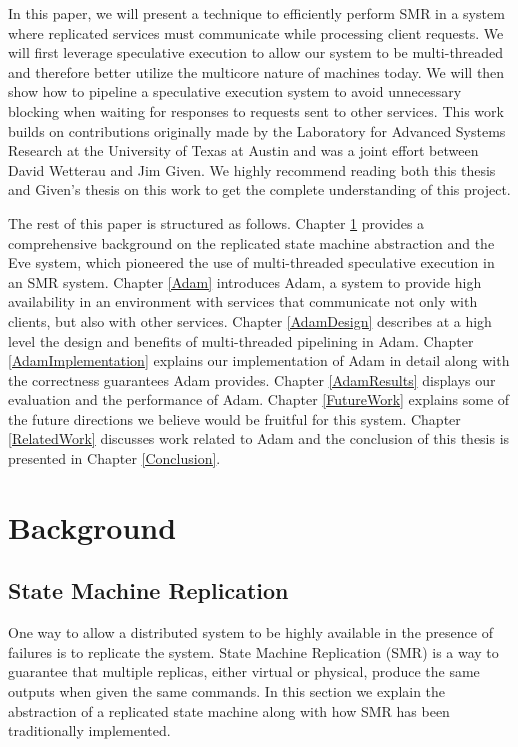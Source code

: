 \documentclass[11pt, oneside]{report}
\begin{document}
In this paper, we will present a technique to efficiently perform SMR in a system where replicated services must communicate while processing client requests.
We will first leverage speculative execution \cite{eve, zyz} to allow our system to be multi-threaded and therefore better utilize the multicore nature of machines today. 
We will then show how to pipeline a speculative execution system to avoid unnecessary blocking when waiting for responses to requests sent to other services.
This work builds on contributions originally made by the Laboratory for Advanced Systems Research at the University of Texas at Austin \cite{eve, manosThesis} and was a joint effort between David Wetterau and Jim Given. 
We highly recommend reading both this thesis and Given's thesis \cite{jim} on this work to get the complete understanding of this project.

The rest of this paper is structured as follows. 
Chapter \ref{Background} provides a comprehensive background on the replicated state machine abstraction and the Eve system, which pioneered the use of multi-threaded speculative execution in an SMR system. 
Chapter \ref{Adam} introduces Adam, a system to provide high availability in an environment with services that communicate not only with clients, but also with other services. 
Chapter \ref{AdamDesign} describes at a high level the design and benefits of multi-threaded pipelining in Adam. 
Chapter \ref{AdamImplementation} explains our implementation of Adam in detail along with the correctness guarantees Adam provides. 
Chapter \ref{AdamResults} displays our evaluation and the performance of Adam. 
Chapter \ref{FutureWork} explains some of the future directions we believe would be fruitful for this system.
Chapter \ref{RelatedWork} discusses work related to Adam and the conclusion of this thesis is presented in Chapter \ref{Conclusion}.

\chapter{Background}\label{Background}
\section{State Machine Replication}
One way to allow a distributed system to be highly available in the presence of failures is to replicate the system.
State Machine Replication (SMR) is a way to guarantee that multiple replicas, either virtual or physical, produce the same outputs when given the same commands. 
In this section we explain the abstraction of a replicated state machine along with how SMR has been traditionally implemented.
\end{document}
